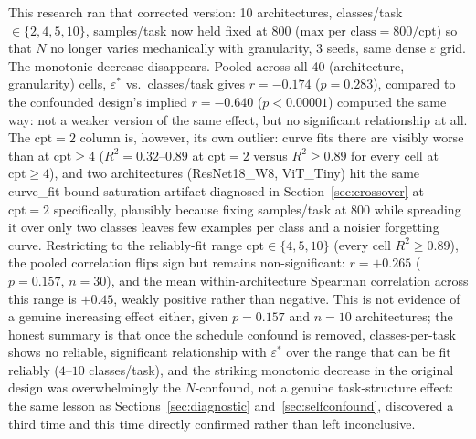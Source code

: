 \documentclass[11pt]{article}
\newcommand{\eps}{\varepsilon}
\newcommand{\epsstar}{\eps^{*}}
\begin{document}
This research ran that corrected version: 10 architectures, classes/task
$\in\{2,4,5,10\}$, samples/task now held fixed at $800$
($\text{max\_per\_class} = 800/\text{cpt}$) so that $N$ no longer varies
mechanically with granularity, 3 seeds, same dense $\eps$ grid. The
monotonic decrease disappears. Pooled across all 40 (architecture,
granularity) cells, $\epsstar$ vs.\ classes/task gives $r=-0.174$
($p=0.283$), compared to the confounded design's implied $r=-0.640$
($p<0.00001$) computed the same way: not a weaker version of the same
effect, but no significant relationship at all. The $\text{cpt}=2$ column
is, however, its own outlier: curve fits there are visibly worse than at
$\text{cpt}\ge4$ ($R^2=0.32$--$0.89$ at $\text{cpt}=2$ versus $R^2\ge0.89$
for every cell at $\text{cpt}\ge4$), and two architectures
(ResNet18\_W8, ViT\_Tiny) hit the same curve\_fit bound-saturation artifact
diagnosed in Section~\ref{sec:crossover} at $\text{cpt}=2$ specifically,
plausibly because fixing samples/task at $800$ while spreading it over only
two classes leaves few examples per class and a noisier forgetting curve.
Restricting to the reliably-fit range $\text{cpt}\in\{4,5,10\}$ (every cell
$R^2\ge0.89$), the pooled correlation flips sign but remains
non-significant: $r=+0.265$ ($p=0.157$, $n=30$), and the mean
within-architecture Spearman correlation across this range is $+0.45$,
weakly positive rather than negative. This is not evidence of a
genuine increasing effect either, given $p=0.157$ and $n=10$ architectures;
the honest summary is that once the schedule confound is removed, classes-per-task
shows no reliable, significant relationship with $\epsstar$ over the range
that can be fit reliably ($4$--$10$ classes/task), and the striking monotonic
decrease in the original design was overwhelmingly the $N$-confound, not a
genuine task-structure effect: the same lesson as
Sections~\ref{sec:diagnostic} and~\ref{sec:selfconfound}, discovered a
third time and this time directly confirmed rather than left inconclusive.
\end{document}
